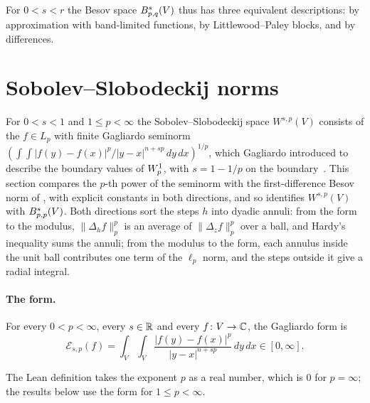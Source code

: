 For $0 < s < r$ the Besov space $B^{s}_{p,q}(V)$ thus has three equivalent descriptions: by
approximation with band-limited functions, by Littlewood--Paley blocks, and by differences.

\section{Sobolev--Slobodeckij norms}
\label{sec:sobolev-slobodeckij}

For $0 < s < 1$ and $1 \leq p < \infty$ the Sobolev--Slobodeckij space $W^{s,p}(V)$ consists of
the $f \in L_p$ with finite Gagliardo seminorm
$(\int\!\int |f(y) - f(x)|^p / |y - x|^{n + sp} \, dy \, dx)^{1/p}$, which Gagliardo introduced
to describe the boundary values of $W^{1}_{p}$, with $s = 1 - 1/p$ on the
boundary~\cite{Gagliardo1957}. This section compares the $p$-th power of the seminorm with the
first-difference Besov norm of , with explicit constants in both directions,
and so identifies $W^{s,p}(V)$ with $B^{s}_{p,p}(V)$. Both directions sort the steps $h$
into dyadic annuli: from the form to the modulus, $\|\Delta_h f\|_p^p$ is an average of
$\|\Delta_z f\|_p^p$ over a ball, and Hardy's inequality sums the annuli; from the modulus to
the form, each annulus inside the unit ball contributes one term of the $\ell_p$ norm, and the
steps outside it give a radial integral.

\paragraph{The form.}

\begin{definition}
\label{def:slobodeckij-form}
\leanok
For every $0 < p < \infty$, every $s \in \mathbb{R}$ and every $f \colon V \to \mathbb{C}$, the Gagliardo
form is
\[
  \mathcal{E}_{s,p}(f) = \int_V \int_V \frac{|f(y) - f(x)|^p}{|y - x|^{n + sp}} \, dy \, dx
  \in [0, \infty] .
\]
\end{definition}

The Lean definition takes the exponent $p$ as a real number, which is $0$ for $p = \infty$; the
results below use the form for $1 \leq p < \infty$.

